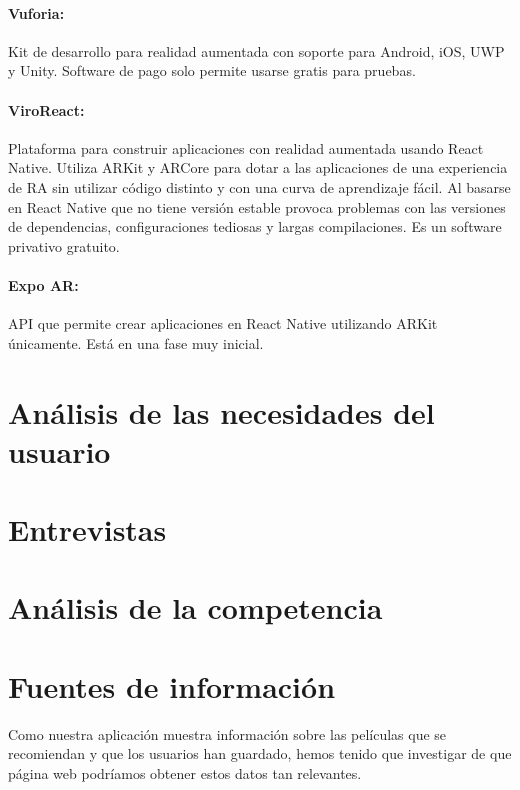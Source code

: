 \paragraph{Vuforia:}
Kit de desarrollo para realidad aumentada con soporte para Android, iOS, UWP y Unity.
Software de pago solo permite usarse gratis para pruebas.

\paragraph{ViroReact:}
Plataforma para construir aplicaciones con realidad aumentada usando React Native.
 Utiliza ARKit y ARCore para dotar a las aplicaciones de una experiencia de RA sin
 utilizar código distinto y con una curva de aprendizaje fácil. Al basarse en React
 Native que no tiene versión estable provoca problemas con las versiones de dependencias,
 configuraciones tediosas y largas compilaciones.
Es un software privativo gratuito.

\paragraph{Expo AR:}
API que permite crear aplicaciones en React Native utilizando ARKit únicamente.
Está en una fase muy inicial.




\section{Análisis de las necesidades del usuario}
\label{makereference2.2}

\section{Entrevistas}
\label{makereference2.3}

\section{Análisis de la competencia}
\label{makereference2.4}

\newpage
\section{Fuentes de información}
\label{makereference2.5}
Como nuestra aplicación muestra información sobre las películas que se recomiendan y que los usuarios han guardado, hemos
tenido que investigar de que página web podríamos obtener estos datos tan relevantes.
